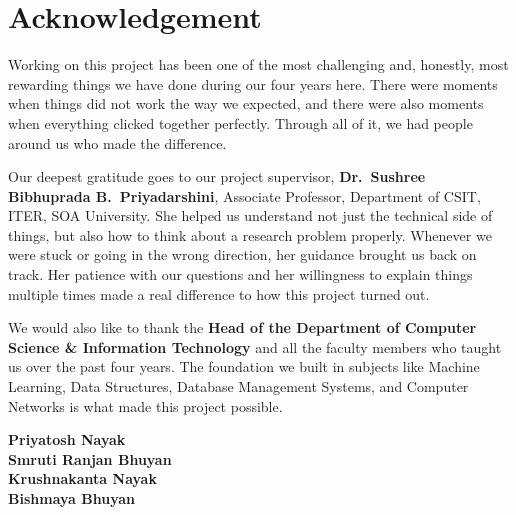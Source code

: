 \chapter*{Acknowledgement}
\thispagestyle{plain}

Working on this project has been one of the most challenging and, honestly, most rewarding things we have done during our four years here. There were moments when things did not work the way we expected, and there were also moments when everything clicked together perfectly. Through all of it, we had people around us who made the difference.

\vspace{0.2in}

\noindent Our deepest gratitude goes to our project supervisor, \textbf{Dr.\ Sushree Bibhuprada B.\ Priyadarshini}, Associate Professor, Department of CSIT, ITER, SOA University. She helped us understand not just the technical side of things, but also how to think about a research problem properly. Whenever we were stuck or going in the wrong direction, her guidance brought us back on track. Her patience with our questions and her willingness to explain things multiple times made a real difference to how this project turned out.

\vspace{0.2in}

\noindent We would also like to thank the \textbf{Head of the Department of Computer Science \& Information Technology} and all the faculty members who taught us over the past four years. The foundation we built in subjects like Machine Learning, Data Structures, Database Management Systems, and Computer Networks is what made this project possible.

\vspace{0.6in}

\noindent\textbf{Priyatosh Nayak}\\
\textbf{Smruti Ranjan Bhuyan}\\
\textbf{Krushnakanta Nayak}\\
\textbf{Bishmaya Bhuyan}
